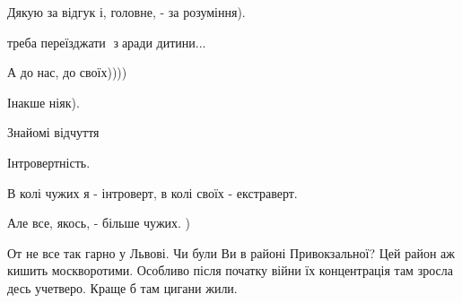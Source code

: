 \begin{itemize}
Дякую за відгук і, головне, - за розуміння).

 
треба переїзджати🤔 з🤗аради дитини...💞💞💞

 
А до нас, до своїх))))🤗

 
Інакше ніяк).

 
Знайомі відчуття

 
Інтровертність.

В колі чужих я - інтроверт, в колі своїх - екстраверт.

Але все, якось, - більше чужих. )

 

От не все так гарно у Львові. Чи були Ви в районі Привокзальної? Цей район аж
кишить москворотими. Особливо після початку війни їх концентрація там зросла
десь учетверо. Краще б там цигани жили.


\end{itemize}
